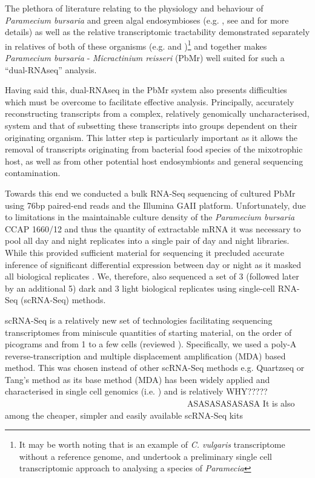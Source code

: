 The plethora of literature relating to the physiology and behaviour of \textit{Paramecium bursaria} and green algal endosymbioses (e.g. \citep{Iwatsuki1988}, 
    see \citep{Kato2009a} and  for more details) as well as the relative transcriptomic tractability demonstrated separately in relatives of
    both of these organisms (e.g. \citep{Guarnieri2011,Rowe2014,Bashan2015} and \citep{Arnaiz2010,Kolisko2014})\footnote{It may be worth noting
        that \citep{Guarnieri2011} is an example of \textit{C. vulgaris} transcriptome without a reference genome, and \citep{Kolisko2014} undertook
    a preliminary single cell transcriptomic approach to analysing a species of \textit{Paramecia}}
and together \citep{Kodama2014} makes \textit{Paramecium bursaria} - \textit{Micractinium reisseri} (PbMr)
well suited for such a ``dual-RNAseq'' analysis.  

Having said this, dual-RNAseq in the PbMr system also presents difficulties which must be overcome to facilitate effective analysis.
Principally, accurately reconstructing transcripts from a complex, relatively genomically uncharacterised, system and 
that of subsetting these transcripts into groups dependent on their originating organism.  This latter step is particularly important
as it allows the removal of transcripts originating from bacterial food species of the mixotrophic host, as well as from other potential
host endosymbionts and general sequencing contamination.  


Towards this end we conducted a bulk RNA-Seq sequencing of cultured PbMr using 76bp paired-end reads and the Illumina GAII platform.
Unfortunately, due to limitations in the maintainable culture density of the \textit{Paramecium bursaria} CCAP 1660/12 and thus the quantity of extractable
mRNA it was necessary to pool all day and night replicates into a single pair of day and night libraries. 
While this provided sufficient material for sequencing it precluded accurate inference of significant differential expression between day or night
as it masked all biological replicates \citep{Auer2010}.  We, therefore, also sequenced a set of 3 (followed later by an additional 5) dark and 3 light
biological replicates using single-cell RNA-Seq (scRNA-Seq) methods. 


scRNA-Seq is a relatively new set of technologies facilitating sequencing transcriptomes from miniscule quantities of starting material, on the order of picograms
and from 1 to a few cells (reviewed \citep{Macaulay2014,Liang2014,Wu2014a}).  Specifically, we used a poly-A reverse-transcription
and multiple displacement amplification (MDA) based method.  
This was chosen instead of other scRNA-Seq methods e.g. Quartzseq \citep{Sasagawa2013} or 
Tang's method \citep{Tang2009} as its base method (MDA) has been widely applied and characterised in single cell genomics (i.e. \citep{Spits2006}) and is
relatively WHY????? 
~~~~~~~~~~~~~~~~~~~~~~~~~~~~~~~~~~~~~~~~~~~ASASASASASASA
It is also among the cheaper, simpler and easily available scRNA-Seq kits 


